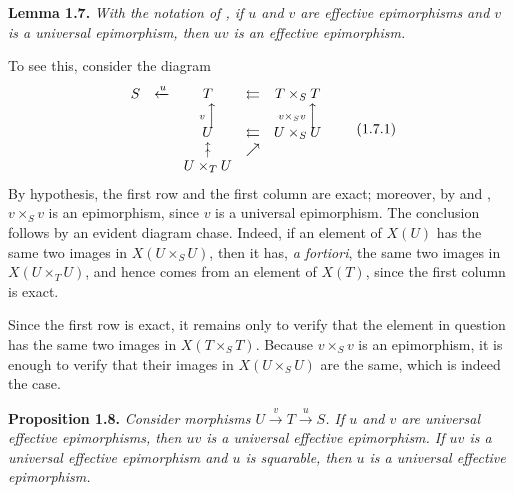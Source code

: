 
\medskip
\noindent{}\textbf{Lemma 1.7.}
\textit{With the notation of , if \(u\) and \(v\) are effective
epimorphisms and \(v\) is a universal epimorphism, then \(uv\) is an
effective epimorphism.}

To see this, consider the diagram
\[
\begin{array}{ccccc}
  S & \xleftarrow{u} & T & \leftleftarrows & T\times_S T \\
    &                 & \scriptstyle v\,\Big\uparrow
                      &                  & \scriptstyle v\times_Sv\,\Big\uparrow \\[-0.25em]
    &                 & U & \leftleftarrows & U\times_S U \\
    &                 & \substack{\uparrow\\[-0.6ex]\uparrow}
                      & \nearrow & \\
    &                 & U\times_T U & &
\end{array}
\tag{1.7.1}\label{sga3:iv:lemma:1:7:eq:1:7:1:01}
\]
By hypothesis, the first row and the first column are exact; moreover,
by  and , \(v\times_Sv\) is an epimorphism, since \(v\) is a
universal epimorphism. The conclusion follows by an evident diagram chase.
Indeed, if an element of \(X(U)\) has the same two images in
\(X(U\times_SU)\), then it has, \textit{a fortiori}, the same two images in
\(X(U\times_TU)\), and hence comes from an element of \(X(T)\), since the
first column is exact.

Since the first row is exact, it remains only to verify that the element in
question has the same two images in \(X(T\times_ST)\). Because
\(v\times_Sv\) is an epimorphism, it is enough to verify that their images in
\(X(U\times_SU)\) are the same, which is indeed the case.

\medskip
\noindent{}\textbf{Proposition 1.8.}
\textit{Consider morphisms \(U\xrightarrow{v}T\xrightarrow{u}S\). If \(u\)
and \(v\) are universal effective epimorphisms, then \(uv\) is a universal
effective epimorphism. If \(uv\) is a universal effective
epimorphism and \(u\) is squarable, then \(u\) is a universal effective
epimorphism.}

